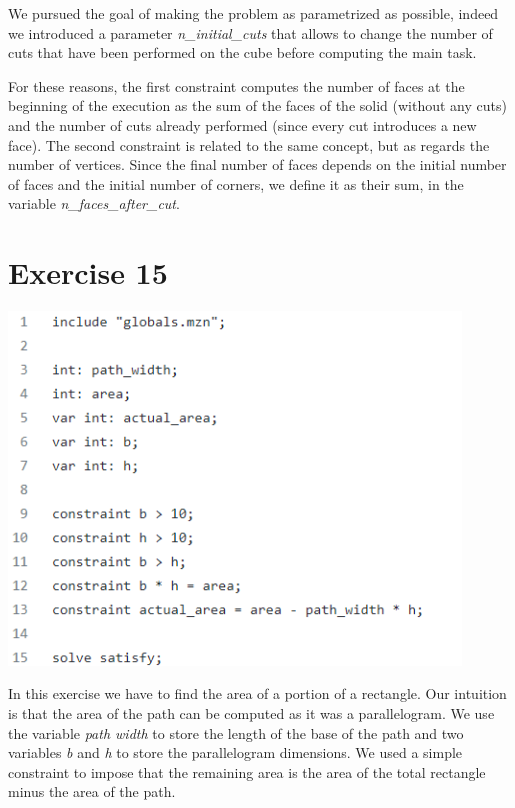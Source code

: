 \documentclass{article}
\begin{document}
We pursued the goal of making the problem as parametrized as possible, indeed we introduced a parameter \textit{n\_initial\_cuts}
that allows to change the number of cuts that have been performed on the cube before computing the main task.

For these reasons, the first constraint computes the number of faces at the beginning of the execution as 
the sum of the faces of the solid (without any cuts) and the number of cuts already performed (since every cut introduces a new face).
The second constraint is related to the same concept, but as regards the number of vertices.
Since the final number of faces depends on the initial number of faces and the initial number of corners,
we define it as their sum, in the variable \textit{n\_faces\_after\_cut}.

\section{Exercise 15}
\vspace{0.2cm}
\includegraphics[width=12cm]{img/Es15.png}
\vspace{0.2cm}

In this exercise we have to find the area of a portion of a rectangle. Our intuition is that the area of the path can be computed as it was a parallelogram. We use the variable \textit{path width} to store the length of the base of the path and two variables \textit{b} and \textit{h} to store the parallelogram dimensions. We used a simple constraint to impose that the remaining area is the area of the total rectangle minus the area of the path.
\end{document}
